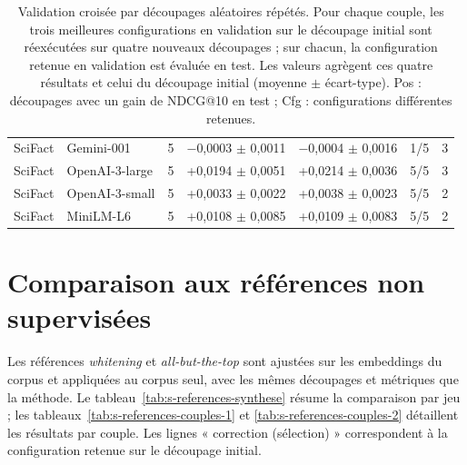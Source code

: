 \documentclass[a4paper,10pt]{article}
\begin{document}
\begin{table}[p]
\begin{tabular}{lllccll}
SciFact & Gemini-001 & 5 & $-$0,0003 $\pm$ 0,0011 & $-$0,0004 $\pm$ 0,0016 & 1/5 & 3 \\
SciFact & OpenAI-3-large & 5 & +0,0194 $\pm$ 0,0051 & +0,0214 $\pm$ 0,0036 & 5/5 & 3 \\
SciFact & OpenAI-3-small & 5 & +0,0033 $\pm$ 0,0022 & +0,0038 $\pm$ 0,0023 & 5/5 & 2 \\
SciFact & MiniLM-L6 & 5 & +0,0108 $\pm$ 0,0085 & +0,0109 $\pm$ 0,0083 & 5/5 & 2 \\
\bottomrule
\end{tabular}
\caption{Validation croisée par découpages aléatoires répétés. Pour chaque couple, les trois meilleures configurations en validation sur le découpage initial sont réexécutées sur quatre nouveaux découpages ; sur chacun, la configuration retenue en validation est évaluée en test. Les valeurs agrègent ces quatre résultats et celui du découpage initial (moyenne $\pm$ écart-type). Pos : découpages avec un gain de NDCG@10 en test ; Cfg : configurations différentes retenues.}
\label{tab:s-validation-croisee}
\end{table}


\section{Comparaison aux références non supervisées}

Les références \textit{whitening} et \textit{all-but-the-top} sont ajustées sur les embeddings du corpus et appliquées au corpus seul, avec les mêmes découpages et métriques que la méthode. Le tableau~\ref{tab:s-references-synthese} résume la comparaison par jeu ; les tableaux~\ref{tab:s-references-couples-1} et \ref{tab:s-references-couples-2} détaillent les résultats par couple. Les lignes « correction (sélection) » correspondent à la configuration retenue sur le découpage initial.
\end{document}
